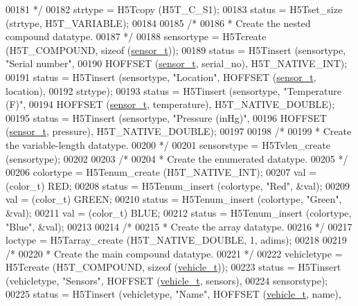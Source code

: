 \begin{DoxyCode}
00181 \textcolor{comment}{     */}
00182     strtype = H5Tcopy (H5T\_C\_S1);
00183     status = H5Tset\_size (strtype, H5T\_VARIABLE);
00184 
00185     \textcolor{comment}{/*}
00186 \textcolor{comment}{     * Create the nested compound datatype.}
00187 \textcolor{comment}{     */}
00188     sensortype = H5Tcreate (H5T\_COMPOUND, \textcolor{keyword}{sizeof} (\hyperlink{structsensor__t}{sensor\_t}));
00189     status = H5Tinsert (sensortype, \textcolor{stringliteral}{"Serial number"},
00190                 HOFFSET (\hyperlink{structsensor__t}{sensor\_t}, serial\_no), H5T\_NATIVE\_INT);
00191     status = H5Tinsert (sensortype, \textcolor{stringliteral}{"Location"}, HOFFSET (\hyperlink{structsensor__t}{sensor\_t}, location),
00192                 strtype);
00193     status = H5Tinsert (sensortype, \textcolor{stringliteral}{"Temperature (F)"},
00194                 HOFFSET (\hyperlink{structsensor__t}{sensor\_t}, temperature), H5T\_NATIVE\_DOUBLE);
00195     status = H5Tinsert (sensortype, \textcolor{stringliteral}{"Pressure (inHg)"},
00196                 HOFFSET (\hyperlink{structsensor__t}{sensor\_t}, pressure), H5T\_NATIVE\_DOUBLE);
00197 
00198     \textcolor{comment}{/*}
00199 \textcolor{comment}{     * Create the variable-length datatype.}
00200 \textcolor{comment}{     */}
00201     sensorstype = H5Tvlen\_create (sensortype);
00202 
00203     \textcolor{comment}{/*}
00204 \textcolor{comment}{     * Create the enumerated datatype.}
00205 \textcolor{comment}{     */}
00206     colortype = H5Tenum\_create (H5T\_NATIVE\_INT);
00207     val = (color\_t) RED;
00208     status = H5Tenum\_insert (colortype, \textcolor{stringliteral}{"Red"}, &val);
00209     val = (color\_t) GREEN;
00210     status = H5Tenum\_insert (colortype, \textcolor{stringliteral}{"Green"}, &val);
00211     val = (color\_t) BLUE;
00212     status = H5Tenum\_insert (colortype, \textcolor{stringliteral}{"Blue"}, &val);
00213 
00214     \textcolor{comment}{/*}
00215 \textcolor{comment}{     * Create the array datatype.}
00216 \textcolor{comment}{     */}
00217     loctype = H5Tarray\_create (H5T\_NATIVE\_DOUBLE, 1, adims);
00218 
00219     \textcolor{comment}{/*}
00220 \textcolor{comment}{     * Create the main compound datatype.}
00221 \textcolor{comment}{     */}
00222     vehicletype = H5Tcreate (H5T\_COMPOUND, \textcolor{keyword}{sizeof} (\hyperlink{structvehicle__t}{vehicle\_t}));
00223     status = H5Tinsert (vehicletype, \textcolor{stringliteral}{"Sensors"}, HOFFSET (\hyperlink{structvehicle__t}{vehicle\_t}, sensors),
00224                 sensorstype);
00225     status = H5Tinsert (vehicletype, \textcolor{stringliteral}{"Name"}, HOFFSET (\hyperlink{structvehicle__t}{vehicle\_t}, name),

\end{DoxyCode}
